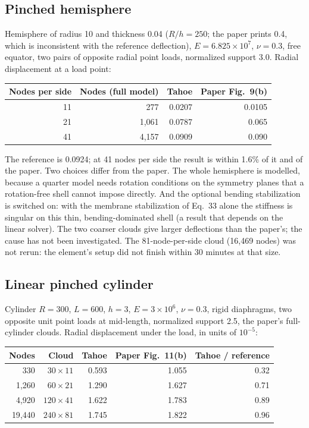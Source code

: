 \documentclass[11pt,a4paper]{article}
\begin{document}
\subsection{Pinched hemisphere}\label{sec:hemisphere}
Hemisphere of radius 10 and thickness 0.04 ($R/h=250$; the paper prints 0.4, which is inconsistent
with the reference deflection), $E=6.825\times10^7$, $\nu=0.3$, free equator, two pairs of opposite
radial point loads, normalized support 3.0. Radial displacement at a load point:

\begin{table}[h]
\centering\small
\begin{tabular}{@{}rrrr@{}}
\toprule
Nodes per side & Nodes (full model) & Tahoe & Paper Fig.~9(b) \\
\midrule
11 & 277 & 0.0207 & 0.0105 \\
21 & 1{,}061 & 0.0787 & 0.065 \\
41 & 4{,}157 & 0.0909 & 0.090 \\
\bottomrule
\end{tabular}
\end{table}

The reference is 0.0924; at 41 nodes per side the result is within 1.6\% of it and of the paper.
Two choices differ from the paper. The whole hemisphere is modelled, because a quarter model needs
rotation conditions on the symmetry planes that a rotation-free shell cannot impose directly. And
the optional bending stabilization is switched on: with the membrane stabilization of Eq.~33 alone
the stiffness is singular on this thin, bending-dominated shell (a result that depends on the linear
solver). The two coarser clouds give larger deflections than the paper's; the cause has not been
investigated. The 81-node-per-side cloud (16{,}469 nodes) was not rerun: the element's
setup did not finish within 30 minutes at that size.

\subsection{Linear pinched cylinder}\label{sec:linpinch}
Cylinder $R=300$, $L=600$, $h=3$, $E=3\times10^6$, $\nu=0.3$, rigid diaphragms, two opposite unit
point loads at mid-length, normalized support 2.5, the paper's full-cylinder clouds. Radial
displacement under the load, in units of $10^{-5}$:

\begin{table}[h]
\centering\small
\begin{tabular}{@{}rrrrr@{}}
\toprule
Nodes & Cloud & Tahoe & Paper Fig.~11(b) & Tahoe / reference \\
\midrule
330 & $30\times11$ & 0.593 & 1.055 & 0.32 \\
1{,}260 & $60\times21$ & 1.290 & 1.627 & 0.71 \\
4{,}920 & $120\times41$ & 1.622 & 1.783 & 0.89 \\
19{,}440 & $240\times81$ & 1.745 & 1.822 & 0.96 \\
\bottomrule
\end{tabular}
\end{table}
\end{document}
